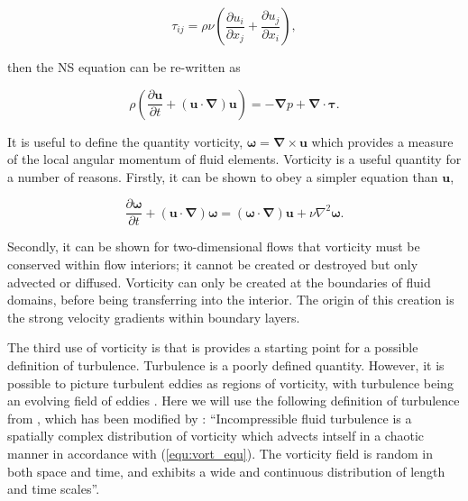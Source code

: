 \documentclass[12pt]{article}
\begin{document}
\begin{equation}
\label{equ:stress}
\tau_{ij} = \rho \nu \left(\frac{\partial u_{i}}{\partial x_{j}} + \frac{\partial u_{j}}{\partial x_{i}}\right),
\end{equation}

then the NS equation can be re-written as

\begin{equation}
\label{equ:NS_stress}
\rho\left(\frac{\partial \boldsymbol{u}}{\partial t} + (\boldsymbol{u} \cdot \boldsymbol{\nabla}) \boldsymbol{u}\right) = -\boldsymbol{\nabla} p + \boldsymbol{\nabla} \cdot \boldsymbol{\tau}.
\end{equation}

It is useful to define the quantity vorticity, $\boldsymbol{\omega} = \boldsymbol{\nabla} \times \boldsymbol{u}$ which provides a measure of the local angular momentum of fluid elements. Vorticity is a useful quantity for a number of reasons. Firstly, it can be shown to obey a simpler equation than $\boldsymbol{u}$,

\begin{equation}
\label{equ:vort_equ}
\frac{\partial \boldsymbol{\omega}}{\partial t} + (\boldsymbol{u} \cdot \boldsymbol{\nabla}) \boldsymbol{\omega} = (\boldsymbol{\omega} \cdot \boldsymbol{\nabla}) \boldsymbol{u} + \nu \nabla^{2} \boldsymbol{\omega}.
\end{equation}

Secondly, it can be shown for two-dimensional flows that vorticity must be conserved within flow interiors; it cannot be created or destroyed but only advected or diffused. Vorticity can only be created at the boundaries of fluid domains, before being transferring into the interior. The origin of this creation is the strong velocity gradients within boundary layers. 

The third use of vorticity is that is provides a starting point for a possible definition of turbulence. Turbulence is a poorly defined quantity. However, it is possible to picture turbulent eddies as regions of vorticity, with turbulence being an evolving field of eddies \citep{Davidson04}. Here we will use the following definition of turbulence from \citet{Corrsin61}, which has been modified by \citet{Davidson04}: ``Incompressible fluid turbulence is a spatially complex distribution of vorticity which advects intself in a chaotic manner in accordance with (\ref{equ:vort_equ}). The vorticity field is random in both space and time, and exhibits a wide and continuous distribution of length and time scales''. 
\end{document}
